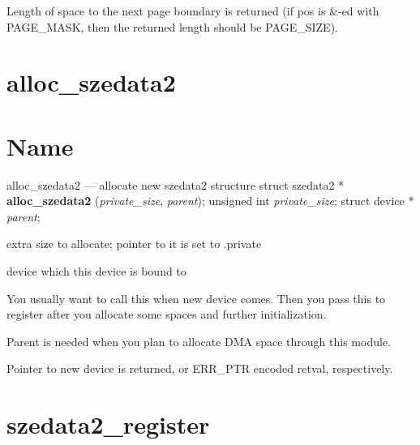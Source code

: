 Length of space to the next page boundary is returned (if pos is \&-ed with PAGE\_MASK, then the returned length should be PAGE\_SIZE).
% 
\section*{alloc\_szedata2}
\label{API-alloc-szedata2}\hypertarget{API-alloc-szedata2}{}%
\label{id245514}

\section*{Name}
alloc\_szedata2 --- allocate new szedata2 structure\label{id245524}
\label{id245529}struct szedata2 * \textbf{ alloc\_szedata2 } ({\ttfamily\itshape{{private\_size}}}, {\ttfamily\itshape{{parent}}});
	\newline
	unsigned int {\ttfamily\itshape{{private\_size}}};
	\newline
	struct device * {\ttfamily\itshape{{parent}}};
\label{id245556}

\begin{kdocdescription}
\item[{{\ttfamily\itshape{{private\_size}}}}]
extra size to allocate; pointer to it is set to .private
\item[{{\ttfamily\itshape{{parent}}}}]
device which this device is bound to
\end{kdocdescription}
\noindent 
{}
\label{id245598}

You usually want to call this when new device comes. Then you pass this to register after you allocate some spaces and further initialization.

Parent is needed when you plan to allocate DMA space through this module.

Pointer to new device is returned, or ERR\_PTR encoded retval, respectively.
% 
\section*{szedata2\_register}
\label{API-szedata2-register}\hypertarget{API-szedata2-register}{}%
\label{id245649}

